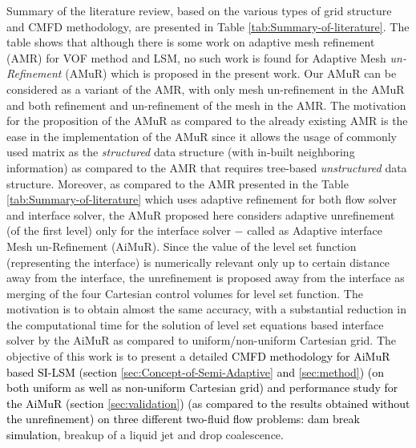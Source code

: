 \documentclass[preprint,12pt]{elsarticle}
\newcommand{\review}[1]{\color{black}#1}
\begin{document}
Summary of the literature review, based on the various types of grid
structure and CMFD methodology, are presented in  Table \ref{tab:Summary-of-literature}.
The table shows that although there is some work on adaptive mesh
refinement (AMR) for VOF method and LSM, no such work is found for
Adaptive Mesh \emph{un-Refinement} (AMuR) which is proposed in the
present work. \review{Our AMuR can be considered as a variant of the AMR, with only mesh un-refinement in the AMuR and both refinement and un-refinement of the mesh in the AMR.} The motivation for the proposition of the AMuR as compared
to the already existing AMR is the ease in the implementation of the
AMuR since it allows the usage of commonly used matrix as the \emph{structured}
data structure (with in-built neighboring information) as compared
to the AMR that requires tree-based \emph{unstructured} data structure.
Moreover, as compared to the AMR presented in the Table \ref{tab:Summary-of-literature}
which uses adaptive refinement for both flow solver and interface
solver, the AMuR proposed here considers adaptive unrefinement (of the first level) only
for the interface solver $-$ called as Adaptive interface Mesh un-Refinement
(AiMuR). Since the value of the level set function (representing the
interface) is numerically relevant only up to certain distance away
from the interface, the unrefinement is proposed away from the interface
as merging of the four Cartesian control volumes for level set function.
The motivation is to obtain almost the same accuracy, with a substantial
reduction in the computational time for the solution of level set
equations based interface solver by the AiMuR as compared to uniform/non-uniform Cartesian grid. The objective of this work is to present a detailed \textcolor{black}{CMFD methodology for AiMuR based SI-LSM (section \ref{sec:Concept-of-Semi-Adaptive} and \ref{sec:method}) (on both uniform as well as non-uniform Cartesian grid) and performance study for the AiMuR (section \ref{sec:validation}) (as compared to the results obtained without the unrefinement) on three different two-fluid flow problems: dam break simulation, }breakup of a liquid jet and drop coalescence\textcolor{black}{.}
\end{document}
